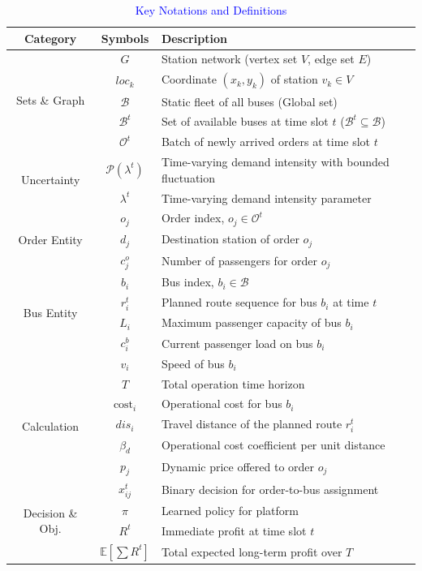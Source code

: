 \documentclass[lettersize,journal]{IEEEtran}
\begin{document}
\begin{table}[!htbp]
\centering
\caption{\textcolor{blue}{Key Notations and Definitions}}
\footnotesize %
\setlength{\tabcolsep}{0.3mm}
\label{tab:not}
\begin{center}
\begin{tabular}{c|c|l}
\toprule
\textbf{Category} & \textbf{Symbols} & \textbf{Description} \\
\midrule
\multirow{5}{*}{Sets \& Graph} 
 & $G$ & Station network (vertex set $V$, edge set $E$) \\
 & $loc_k$ & Coordinate $(x_k, y_k)$ of station $v_k \in V$ \\
 & $\mathcal{B}$ & Static fleet of all buses (Global set) \\
 & $\mathcal{B}^t$ & Set of available buses at time slot $t$ ($\mathcal{B}^t \subseteq \mathcal{B}$) \\
 & $\mathcal{O}^t$ & Batch of newly arrived orders at time slot $t$ \\
\midrule
\multirow{2}{*}{Uncertainty} 
 & $\mathcal{P}(\lambda^t)$ & Time-varying demand intensity with bounded fluctuation \\
 & $\lambda^t$ & Time-varying demand intensity parameter \\
\midrule
\multirow{3}{*}{Order Entity} 
 & $o_j$ & Order index, $o_j \in \mathcal{O}^t$ \\
 & $d_j$ & Destination station of order $o_j$ \\
 & $c^o_j$ & Number of passengers for order $o_j$ \\
\midrule
\multirow{4}{*}{Bus Entity} 
 & $b_i$ & Bus index, $b_i \in \mathcal{B}$ \\
 & $r_i^t$ & Planned route sequence for bus $b_i$ at time $t$ \\
 & $L_i$ & Maximum passenger capacity of bus $b_i$ \\
 & $c^b_i$ & Current passenger load on bus $b_i$ \\
 & $v_i$ & Speed of bus $b_i$ \\
\midrule
\multirow{5}{*}{Calculation}
 & $T$ & Total operation time horizon \\
 & $\text{cost}_i$ & Operational cost for bus $b_i$ \\
 & $dis_i$ & Travel distance of the planned route $r_i^t$ \\
 & $\beta_d$ & Operational cost coefficient per unit distance \\
 & $p_j$ & Dynamic price offered to order $o_j$ \\
\midrule
\multirow{4}{*}{Decision \& Obj.} 
 & $x_{ij}^t$ & Binary decision for order-to-bus assignment \\
 & $\pi$ & Learned policy for platform \\
 & $R^t$ & Immediate profit at time slot $t$ \\
 & $\mathbb{E}[\sum R^t]$ & Total expected long-term profit over $T$ \\
\bottomrule
\end{tabular}
\end{center}
\end{table}
\end{document}
